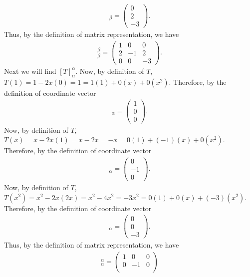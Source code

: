 \documentclass[12pt,answers]{exam}
\begin{document}
\begin{solution}
\begin{enumerate}[label=\roman*)]
\begin{align*}
    [T(x+x^{2})]_{\beta}=\begin{pmatrix} 0 \\ 2 \\ -3 \end{pmatrix}.
\end{align*}
Thus, by the definition of matrix representation, we have
\begin{align*}
    [T]^{\beta}_{\beta}=\begin{pmatrix} 1 & 0 & 0 \\
                                        2 & -1 & 2 \\
                                        0 & 0 & -3 \end{pmatrix}.
\end{align*}
Next we will find $[T]^{\alpha}_{\alpha}$. Now, by definition of $T$, $T(1)=1-2x(0)=1=1(1)+0(x)+0(x^{2})$. Therefore, by the definition of coordinate vector
\begin{align*}
    [T(1)]_{\alpha}=\begin{pmatrix} 1 \\ 0 \\ 0 \end{pmatrix}.
\end{align*}
Now, by definition of $T$, $T(x)=x-2x(1)=x-2x=-x=0(1)+(-1)(x)+0(x^{2})$. Therefore, by the definition of coordinate vector
\begin{align*}
    [T(x)]_{\alpha}=\begin{pmatrix} 0 \\ -1 \\ 0 \end{pmatrix}.
\end{align*}
Now, by definition of $T$, $T(x^{2})=x^{2}-2x(2x)=x^{2}-4x^{2}=-3x^{2}=0(1)+0(x)+(-3)(x^{2})$. Therefore, by the definition of coordinate vector
\begin{align*}
    [T(x^{2})]_{\alpha}=\begin{pmatrix} 0 \\ 0 \\ -3 \end{pmatrix}.
\end{align*}
Thus, by the definition of matrix representation, we have
\begin{align*}
    [T]^{\alpha}_{\alpha}=\begin{pmatrix} 1 & 0 & 0 \\
                                          0 & -1 & 0 \\

\end{pmatrix}
\end{align*}
\end{enumerate}
\end{solution}
\end{document}

